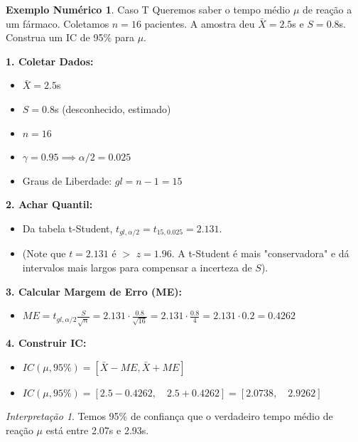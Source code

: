 \documentclass[12pt, a4paper]{article}
\theoremstyle{definition} %
\newtheorem{exemplo}{Exemplo Numérico}[section]
\theoremstyle{remark} %
\newtheorem{interpretacao}{Interpretação}[section]
\begin{document}
\begin{exemplo}{Caso T}
    Queremos saber o tempo médio $\mu$ de reação a um fármaco. Coletamos $n=16$ pacientes. A amostra deu $\bar{X}=2.5$s e $S=0.8$s. Construa um IC de 95\% para $\mu$.

    \textbf{1. Coletar Dados:}
    \begin{itemize}
        \item $\bar{X} = 2.5$s
        \item $S = 0.8$s (desconhecido, estimado)
        \item $n = 16$
        \item $\gamma = 0.95 \implies \alpha/2 = 0.025$
        \item Graus de Liberdade: $gl = n-1 = 15$
    \end{itemize}
    \textbf{2. Achar Quantil:}
    \begin{itemize}
        \item Da tabela t-Student, $t_{gl, \alpha/2} = t_{15, 0.025} = 2.131$.
        \item (Note que $t=2.131$ é $>$ $z=1.96$. A t-Student é mais "conservadora" e dá intervalos mais largos para compensar a incerteza de $S$).
    \end{itemize}
    \textbf{3. Calcular Margem de Erro (ME):}
    \begin{itemize}
        \item $ME = t_{gl, \alpha/2} \frac{S}{\sqrt{n}} = 2.131 \cdot \frac{0.8}{\sqrt{16}} = 2.131 \cdot \frac{0.8}{4} = 2.131 \cdot 0.2 = 0.4262$
    \end{itemize}
    \textbf{4. Construir IC:}
    \begin{itemize}
        \item $IC(\mu, 95\%) = [\bar{X} - ME, \bar{X} + ME]$
        \item $IC(\mu, 95\%) = [2.5 - 0.4262, \quad 2.5 + 0.4262] = [2.0738, \quad 2.9262]$
    \end{itemize}
    \begin{interpretacao}
        Temos 95\% de confiança que o verdadeiro tempo médio de reação $\mu$ está entre 2.07s e 2.93s.
    \end{interpretacao}
\end{exemplo}
\end{document}
